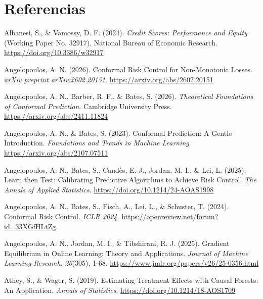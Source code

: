 \documentclass[
  spanish,
  11pt,
  letterpaper,
]{scrbook}
\newlength{\cslhangindent}
\newenvironment{CSLReferences}[2] %
 {\begin{list}{}{%
  \setlength{\itemindent}{0pt}
  \setlength{\leftmargin}{0pt}
  \setlength{\parsep}{0pt}
  \ifodd #1
   \setlength{\leftmargin}{\cslhangindent}
   \setlength{\itemindent}{-1\cslhangindent}
  \fi
  \setlength{\itemsep}{#2\baselineskip}}}
 {\end{list}}
\theoremstyle{plain}
\theoremstyle{remark}
\begin{document}
\chapter*{Referencias}\label{bibliography}

\protect{}\label{refs}
\begin{CSLReferences}{1}{0}
Albanesi, S., \& Vamossy, D. F. (2024). \emph{Credit Scores: Performance
and Equity} (Working Paper No. 32917). National Bureau of Economic
Research. \url{https://doi.org/10.3386/w32917}

Angelopoulos, A. N. (2026). Conformal Risk Control for Non-Monotonic
Losses. \emph{arXiv preprint arXiv:2602.20151}.
\url{https://arxiv.org/abs/2602.20151}

Angelopoulos, A. N., Barber, R. F., \& Bates, S. (2026).
\emph{Theoretical Foundations of Conformal Prediction}. Cambridge
University Press. \url{https://arxiv.org/abs/2411.11824}

Angelopoulos, A. N., \& Bates, S. (2023). Conformal Prediction: A Gentle
Introduction. \emph{Foundations and Trends in Machine Learning}.
\url{https://arxiv.org/abs/2107.07511}

Angelopoulos, A. N., Bates, S., Candès, E. J., Jordan, M. I., \& Lei, L.
(2025). Learn then Test: Calibrating Predictive Algorithms to Achieve
Risk Control. \emph{The Annals of Applied Statistics}.
\url{https://doi.org/10.1214/24-AOAS1998}

Angelopoulos, A. N., Bates, S., Fisch, A., Lei, L., \& Schuster, T.
(2024). Conformal Risk Control. \emph{ICLR 2024}.
\url{https://openreview.net/forum?id=33XGfHLtZg}

Angelopoulos, A. N., Jordan, M. I., \& Tibshirani, R. J. (2025).
Gradient Equilibrium in Online Learning: Theory and Applications.
\emph{Journal of Machine Learning Research}, \emph{26}(305), 1-68.
\url{https://www.jmlr.org/papers/v26/25-0356.html}

Athey, S., \& Wager, S. (2019). Estimating Treatment Effects with Causal
Forests: An Application. \emph{Annals of Statistics}.
\url{https://doi.org/10.1214/18-AOS1709}


\end{CSLReferences}
\end{document}
